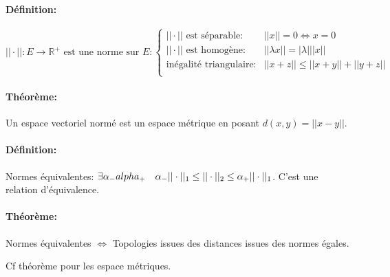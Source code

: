 \documentclass[a4paper, 11pt, french]{book}
\theoremstyle{plain} %
\theoremstyle{definition} %
\theoremstyle{remark} %
\newcommand{\1}{\mathds{1}}
\begin{document}
\paragraph{Définition:}
$
\text{$|| \cdot||:E\rightarrow\mathbb{R}^+$ est une norme sur $E$}:
\left\{
\begin{array}{ll}
	\text{$|| \cdot||$ est séparable:} & ||x||=0\iff x=0\\
	\text{$|| \cdot||$ est homogène:} & || \lambda x||=| \lambda| ||x|| \\
	\text{inégalité triangulaire:} & ||x+z|| \le ||x+y||+||y+z|| \\
\end{array}
\right.
$

\paragraph{Théorème:} Un espace vectoriel normé est un espace métrique en posant $d(x, y)=||x-y||$.

\paragraph{Définition:} Normes équivalentes: $\exists\alpha_-\\alpha_+\quad\alpha_- || \cdot||_1\le || \cdot||_2\le\alpha_+ || \cdot||_1 $. C'est une relation d'équivalence.

\paragraph{Théorème:} Normes équivalentes $\iff$ Topologies issues des distances issues des normes égales.

\fbox{$\implies$} Cf théorème pour les espace métriques.
\end{document}
